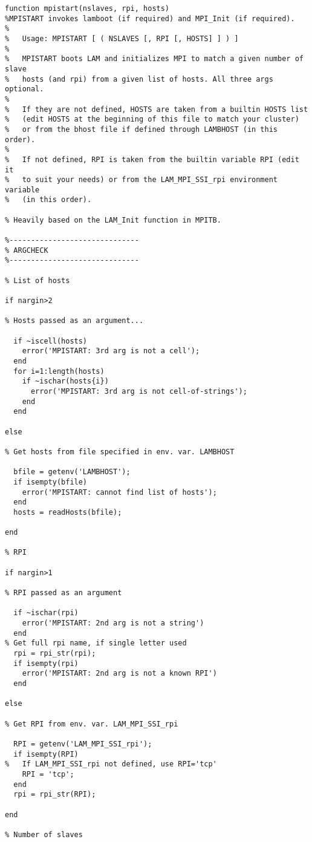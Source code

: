 \begin{lstlisting}[linerange={1-1,16-325}]
function mpistart(nslaves, rpi, hosts)
%MPISTART invokes lamboot (if required) and MPI_Init (if required).
%
%   Usage: MPISTART [ ( NSLAVES [, RPI [, HOSTS] ] ) ]
%
%   MPISTART boots LAM and initializes MPI to match a given number of slave 
%   hosts (and rpi) from a given list of hosts. All three args optional.
%
%   If they are not defined, HOSTS are taken from a builtin HOSTS list
%   (edit HOSTS at the beginning of this file to match your cluster)
%   or from the bhost file if defined through LAMBHOST (in this order).
%
%   If not defined, RPI is taken from the builtin variable RPI (edit it
%   to suit your needs) or from the LAM_MPI_SSI_rpi environment variable
%   (in this order).

% Heavily based on the LAM_Init function in MPITB.

%------------------------------
% ARGCHECK
%------------------------------

% List of hosts

if nargin>2

% Hosts passed as an argument...

  if ~iscell(hosts)
    error('MPISTART: 3rd arg is not a cell');
  end        
  for i=1:length(hosts)
    if ~ischar(hosts{i})
      error('MPISTART: 3rd arg is not cell-of-strings');
    end
  end

else

% Get hosts from file specified in env. var. LAMBHOST

  bfile = getenv('LAMBHOST');
  if isempty(bfile)
    error('MPISTART: cannot find list of hosts');
  end
  hosts = readHosts(bfile);

end

% RPI

if nargin>1

% RPI passed as an argument

  if ~ischar(rpi)
    error('MPISTART: 2nd arg is not a string')
  end
% Get full rpi name, if single letter used
  rpi = rpi_str(rpi);
  if isempty(rpi)
    error('MPISTART: 2nd arg is not a known RPI')
  end

else

% Get RPI from env. var. LAM_MPI_SSI_rpi

  RPI = getenv('LAM_MPI_SSI_rpi');
  if isempty(RPI)
%   If LAM_MPI_SSI_rpi not defined, use RPI='tcp'
    RPI = 'tcp';
  end
  rpi = rpi_str(RPI);

end

% Number of slaves


\end{lstlisting}

